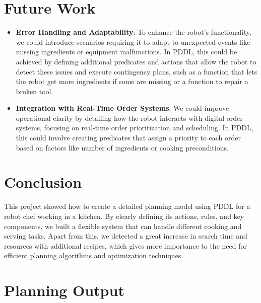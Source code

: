 \documentclass[a4paper,12pt]{article}
\begin{document}
\section{Future Work}
\begin{itemize}
\item \textbf{Error Handling and Adaptability}: To enhance the robot's functionality, we could introduce scenarios requiring it to adapt to unexpected events like missing ingredients or equipment malfunctions. In PDDL, this could be achieved by defining additional predicates and actions that allow the robot to detect these issues and execute contingency plans, such as a function that lets the robot get more ingredients if some are missing or a function to repair a broken tool.

\item \textbf{Integration with Real-Time Order Systems}: We could improve operational clarity by detailing how the robot interacts with digital order systems, focusing on real-time order prioritization and scheduling. In PDDL, this could involve creating predicates that assign a priority to each order based on factors like number of ingredients or cooking preconditions.
\end{itemize}


\section{Conclusion}
\label{sec:conclusion}
This project showed how to create a detailed planning model using PDDL for a robot chef working in a kitchen. By clearly defining its actions, rules, and key components, we built a flexible system that can handle different cooking and serving tasks. Apart from this, we detected a great increase in search time and resources with additional recipes, which gives more importance to the need for efficient planning algorithms and optimization techniques. 



\newpage
\appendix
\section{Planning Output}
\end{document}
